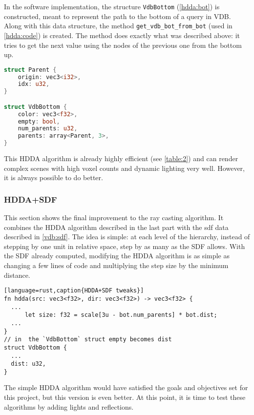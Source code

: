 In the software implementation, the structure \texttt{VdbBottom} (\cref{hdda:bot}) is constructed, meant to represent the path to the bottom of a query in VDB.
Along with this data structure, the method \texttt{get\_vdb\_bot\_from\_bot} (used in \cref{hdda:code}) is created.
The method does exactly what was described above: it tries to get the next value using the nodes of the previous one from the bottom up.

\begin{lstlisting}[language=rust, captionpos=b, caption={
    \texttt{VdbBottom} defintion.
    The structure holds the three (or fewer) parents that the bottom value has, whether the bottom was an empty value, and the colour information if it was voxel.
  }, label={hdda:bot}]
struct Parent {
    origin: vec3<i32>,
    idx: u32,
}

struct VdbBottom {
    color: vec3<f32>,
    empty: bool,
    num_parents: u32,
    parents: array<Parent, 3>,
}
\end{lstlisting}

This HDDA algorithm is already highly efficient (see \cref{table:2}) and can render complex scenes with high voxel counts and dynamic lighting very well. However, it is always possible to do better.

\subsubsection{HDDA+SDF}
This section shows the final improvement to the ray casting algorithm.
It combines the HDDA algorithm described in the last part with the \acrshort{sdf} data described in \cref{vdb:sdf}.
The idea is simple: at each level of the hierarchy, instead of stepping by one unit in relative space, step by as many as the SDF allows.
With the SDF already computed, modifying the HDDA algorithm is as simple as changing a few lines of code and multiplying the step size by the minimum distance.

\begin{lstlisting}[language=rust,caption{HDDA+SDF tweaks}]
fn hdda(src: vec3<f32>, dir: vec3<f32>) -> vec3<f32> {
  ...
      let size: f32 = scale[3u - bot.num_parents] * bot.dist;
  ...
}
// in  the `VdbBottom` struct empty becomes dist
struct VdbBottom {
  ...
  dist: u32,
}
\end{lstlisting}

The simple HDDA algorithm would have satisfied the goals and objectives set for this project, but this version is even better. At this point, it is time to test these algorithms by adding lights and reflections.

